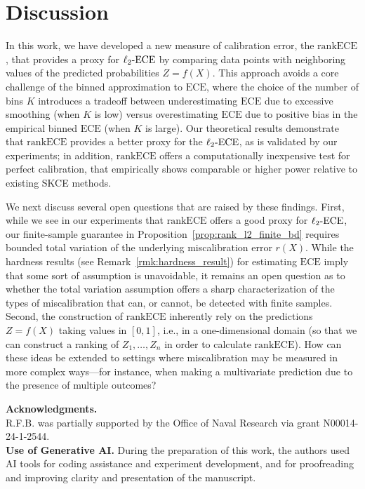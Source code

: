 \documentclass[11pt]{article}
\numberwithin{equation}{section}
\theoremstyle{definition}
\newcommand{\ECE}{\mathrm{ECE}}
\newcommand{\lECE}{\ell_2\textnormal{-}\ECE}
\newcommand{\rankECE}{\mathrm{rankECE}}
\begin{document}
\section{Discussion}\label{sec:discussions}
In this work, we have developed a new measure of calibration error, the $\rankECE$, that provides a proxy for $\lECE$ by comparing data points with neighboring values of the predicted probabilities $Z=f(X)$. This approach avoids a core challenge of the binned approximation to $\ECE$, where the choice of the number of bins $K$ introduces a tradeoff between underestimating $\ECE$ due to excessive smoothing (when $K$ is low) versus overestimating $\ECE$ due to positive bias in the empirical binned $\ECE$ (when $K$ is large). Our theoretical results demonstrate that $\rankECE$ provides a better proxy for the $\lECE$, as is validated by our experiments; in addition, $\rankECE$ offers a computationally inexpensive test for perfect calibration, that empirically shows comparable or higher power relative to existing SKCE methods.

We next discuss several open questions that are raised by these findings. First, while we see in our experiments that $\rankECE$ offers a good proxy for $\lECE$, our finite-sample guarantee in Proposition~\ref{prop:rank_l2_finite_bd} requires bounded total variation of the underlying miscalibration error $r(X)$. While
the hardness results (see Remark~\ref{rmk:hardness_result}) for estimating $\ECE$ imply that some sort of assumption is unavoidable, it remains an open question as to whether the total variation assumption offers a sharp characterization of the types of miscalibration that can, or cannot, be detected with finite samples. Second, the construction of $\rankECE$ inherently rely on the predictions $Z=f(X)$ taking values in $[0,1]$, i.e., in a one-dimensional domain (so that we can construct a ranking of $Z_1,\dots,Z_n$ in order to calculate $\rankECE$). How can these ideas be extended to settings where miscalibration may be measured in more complex ways---for instance, when making a multivariate prediction due to the presence of multiple outcomes?

\bigskip\small

\noindent\textbf{Acknowledgments.}\\
R.F.B. was partially supported by the Office of Naval Research via grant N00014-24-1-2544.\\

\noindent
\textbf{Use of Generative AI.} During the preparation of this work, the authors used AI tools for coding assistance and experiment development, and for proofreading and improving clarity and presentation of the manuscript.
\end{document}
